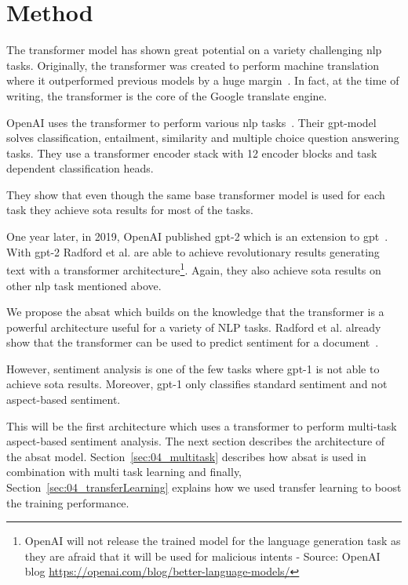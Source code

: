 \chapter{Method}
\label{ch:method}

The transformer model has shown great potential on a variety challenging \gls{nlp} tasks. Originally, the transformer was created to perform machine translation where it outperformed previous models by a huge margin~\cite{Vaswani2017}. In fact, at the time of writing, the transformer is the core of the Google translate engine.
\medskip

OpenAI uses the transformer to perform various \gls{nlp} tasks~\cite{Radford2018}. Their \gls{gpt}-model solves classification, entailment, similarity and multiple choice question answering tasks. They use a transformer encoder stack with 12 encoder blocks and task dependent classification heads. 

They show that even though the same base transformer model is used for each task they achieve \gls{sota} results for most of the tasks.
\medskip

One year later, in 2019, OpenAI published \gls{gpt}-2 which is an extension to \gls{gpt}~\cite{Radford2019}. With \gls{gpt}-2 Radford et al. are able to achieve revolutionary results generating text with a transformer architecture\footnote{OpenAI will not release the trained model for the language generation task as they are afraid that it will be used for malicious intents - Source: OpenAI blog \url{https://openai.com/blog/better-language-models/}}. Again, they also achieve \gls{sota} results on other \gls{nlp} task mentioned above.
\bigskip

We propose the \acrfull{absat} which builds on the knowledge that the transformer is a powerful architecture useful for a variety of NLP tasks. Radford et al. already show that the transformer can be used to predict sentiment for a document~\cite{Radford2018}. 

However, sentiment analysis is one of the few tasks where \gls{gpt}-1 is not able to achieve \gls{sota} results. Moreover, \gls{gpt}-1 only classifies standard sentiment and not aspect-based sentiment.
\medskip

This will be the first architecture which uses a transformer to perform multi-task aspect-based sentiment analysis. The next section describes the architecture of the \gls{absat} model. Section~\ref{sec:04_multitask} describes how \gls{absat} is used in combination with multi task learning and finally, Section~\ref{sec:04_transferLearning} explains how we used transfer learning to boost the training performance.

